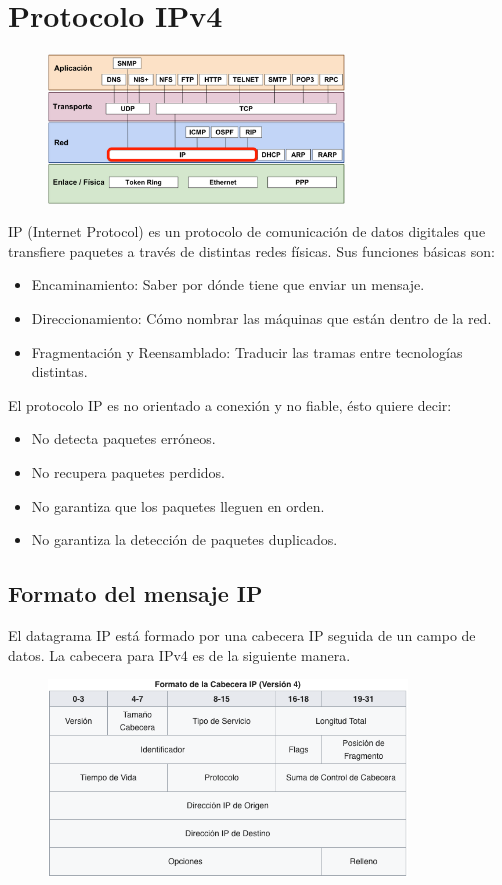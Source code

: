 \section{Protocolo IPv4}
\begin{figure}[H]
    \centering \includegraphics[width=0.7\textwidth]{img/IP.png}
\end{figure}
IP (Internet Protocol) es un protocolo de comunicación de datos digitales que transfiere paquetes a través de distintas redes físicas. Sus funciones básicas son:
\begin{itemize}
\item Encaminamiento: Saber por dónde tiene que enviar un mensaje.
\item Direccionamiento: Cómo nombrar las máquinas que están dentro de la red.
\item Fragmentación y Reensamblado: Traducir las tramas entre tecnologías distintas.
\end{itemize}
El protocolo IP es no orientado a conexión y no fiable, ésto quiere decir:
\begin{itemize}
    \item No detecta paquetes erróneos.
    \item No recupera paquetes perdidos.
    \item No garantiza que los paquetes lleguen en orden.
    \item No garantiza la detección de paquetes duplicados.
\end{itemize}
\subsection{Formato del mensaje IP}

El datagrama IP está formado por una cabecera IP seguida de un campo de datos. La cabecera para IPv4 es de la siguiente manera.

\begin{figure}[h]
\centering
\includegraphics[width=0.85\textwidth]{img/datagramaIPv4.png}
\end{figure}

